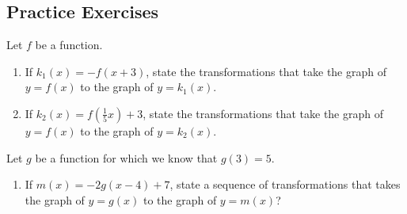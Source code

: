 




\newpage


\subsection*{Practice Exercises} \label{practice-functions-transformations}

\begin{myPractice}
Let $f$ be a function.
\begin{enumerate}

\item If $k_1(x) = - f(x+3)$, state the transformations that take the graph of $y=f(x)$ to the graph of $y=k_1(x)$.
\vfill


\item If $k_2(x) =  f(\frac{1}{5}x)+3$, state the transformations that take the graph of $y=f(x)$ to the graph of $y=k_2(x)$.
\vfill
\end{enumerate}
\end{myPractice}

\begin{myPractice}
Let $g$ be a function for which we know that $g(3)=5$.
\begin{enumerate}
\item If $m(x) = -2g(x-4)+7$, state a sequence of transformations that takes the graph of $y=g(x)$ to the graph of $y=m(x)$?
\vfill
\vfill

\vfill

\end{enumerate}
\end{myPractice}


